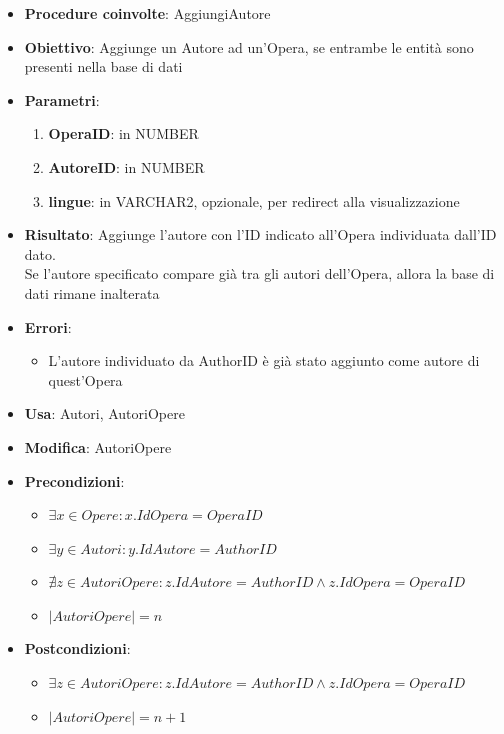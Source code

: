 \label{AggiuntaAutore}
\begin{itemize}
	\item \textbf{Procedure coinvolte}: AggiungiAutore
	\item \textbf{Obiettivo}: Aggiunge un Autore ad un'Opera, se entrambe le entità sono presenti nella base di dati
	\item \textbf{Parametri}:
	\begin{enumerate}
		\item \textbf{OperaID}: in NUMBER
		\item \textbf{AutoreID}: in NUMBER
		\item \textbf{lingue}: in VARCHAR2, opzionale, per redirect alla visualizzazione
	\end{enumerate}
	\item \textbf{Risultato}: Aggiunge l'autore con l'ID indicato all'Opera individuata dall'ID dato.\\
	Se l'autore specificato compare già tra gli autori dell'Opera, allora la base di dati rimane inalterata
	\item \textbf{Errori}: 
	\begin{itemize}
		\item L'autore individuato da AuthorID è già stato aggiunto come autore di quest'Opera
	\end{itemize}
	\item \textbf{Usa}: Autori, AutoriOpere
	\item \textbf{Modifica}: AutoriOpere
	\item \textbf{Precondizioni}:
	\begin{itemize}
		\item $\exists x \in Opere : x.IdOpera = OperaID$
		\item $\exists y \in Autori : y.IdAutore = AuthorID$
		\item $\nexists z \in AutoriOpere : z.IdAutore = AuthorID \land z.IdOpera = OperaID$
		\item $|AutoriOpere| = n$
	\end{itemize}
	\item \textbf{Postcondizioni}:
	\begin{itemize}
		\item $\exists z \in AutoriOpere : z.IdAutore = AuthorID \land z.IdOpera = OperaID$
		\item $|AutoriOpere| = n + 1$
	\end{itemize}
\end{itemize}
